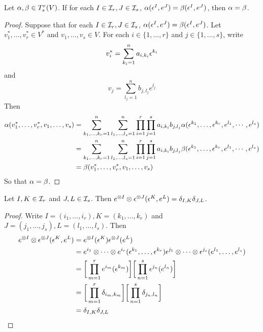 \documentclass{book}
\begin{document}
	\begin{ex}
	Let $\alpha, \beta \in T^r_s(V)$. If for each $I \in \mathcal{I}_r, J \in \mathcal{I}_s$, $\alpha(\epsilon^I, e^J) = \beta(\epsilon^I, e^J)$, then $\alpha = \beta$.
	\end{ex}
	
	\begin{proof}
	Suppose that for each $I \in \mathcal{I}_r, J \in \mathcal{I}_s$, $\alpha(\epsilon^I, e^J) = \beta(\epsilon^I, e^J)$. Let $v^*_1, \dots, v^*_r \in V^*$ and $v_1, \dots, v_s \in V$. For each $i \in \{1, \dots, r\}$ and $j \in \{1, \dots, s\}$, write $$v^*_i = \sum\limits_{k_i = 1}^n a_{i, k_i} \epsilon^{k_i}$$ and $$v_j = \sum\limits_{l_j = 1}^n b_{j, l_j} e^{l_j}$$
	Then 
	\begin{align*}
	\alpha(v^*_1, \dots, v^*_r, v_1, \dots, v_s)
	& = \sum_{k_1, \dots, k_r =1}^n \sum_{l_1, \dots, l_s = 1}^n \prod_{i=1}^r \prod_{j=1}^s a_{i, k_i} b_{j, l_j} \alpha(\epsilon^{k_1}, \dots, \epsilon^{k_r}, e^{l_1}, \cdots, e^{l_s}) \\
	& = \sum_{k_1, \dots, k_r =1}^n \sum_{l_1, \dots, l_s = 1}^n \prod_{i=1}^r \prod_{j=1}^s a_{i, k_i} b_{j, l_j} \beta(\epsilon^{k_1}, \dots, \epsilon^{k_r}, e^{l_1}, \cdots, e^{l_s}) \\
	& = \beta(v^*_1, \dots, v^*_r, v_1, \dots, v_s)
	\end{align*}
	So that $\alpha = \beta$.
	\end{proof}
		
	\begin{ex}
	Let $I, K \in \mathcal{I}_r$  and $J, L \in \mathcal{I}_s$. Then $e^{\otimes I} \otimes \epsilon^{\otimes J}(\epsilon^K, e^L) = \delta_{I,K} \delta_{J,L}$. 
	\end{ex}	
	
	\begin{proof}
	Write $I = (i_1, \dots, i_r), K=(k_1, \dots, k_r)$ and $J = (j_1, \dots, j_s), L = (l_1, \dots, l_s)$. Then 
	\begin{align*}
	e^{\otimes I} \otimes \epsilon^{\otimes J}(\epsilon^K, e^L) 
	& = e^{\otimes I}(\epsilon^K)\epsilon^{\otimes J}(e^L) \\
	& = e^{i_1}\otimes \dots \otimes e^{i_r}(\epsilon^{k_1}, \dots, \epsilon^{k_r}) \epsilon^{j_1}\otimes \dots \otimes \epsilon^{j_s}(e^{l_1}, \dots, e^{l_s}) \\
	& =\bigg[\prod_{m=1}^r e^{i_m}(\epsilon^{k_m}) \bigg] \bigg[ \prod_{n=1}^s  \epsilon^{j_n}(e^{l_n}) \bigg] \\
	& = \bigg[\prod_{m=1}^r \delta_{i_m, k_m} \bigg] \bigg[ \prod_{n=1}^s  \delta_{j_n, l_n} \bigg] \\
	& = \delta_{I,K}\delta_{J,L}
	\end{align*}
\end{proof}		
		
\end{document}
